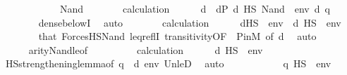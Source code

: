 \begin{isabellebody}
\ \ \ \ \isamarkupfalse%
\ \isanewline
\ \ \ \ \isamarkupfalse%
\ Nand\isanewline
\ \ \ \ \isamarkupfalse%
\ \isamarkupfalse%
\ calculation\isanewline
\ \ \ \ \isamarkupfalse%
\ d\ \ {\isachardoublequoteopen}d{\isasymin}P{\isachardoublequoteclose}\ {\isachardoublequoteopen}d\ {\isasymtturnstile}HS\ Nand{\isacharparenleft}{\kern0pt}{\isasymphi}{\isacharcomma}{\kern0pt}\ {\isasympsi}{\isacharparenright}{\kern0pt}\ env{\isachardoublequoteclose}\ {\isachardoublequoteopen}d{\isasympreceq}\ q{\isachardoublequoteclose}\isanewline
\ \ \ \ \ \ \isamarkupfalse%
\ dense{\isacharunderscore}{\kern0pt}belowI\ \isamarkupfalse%
\ auto\isanewline
\ \ \ \ \isamarkupfalse%
\ \isamarkupfalse%
\ calculation\isanewline
\ \ \ \ \isamarkupfalse%
\ {\isachardoublequoteopen}{\isasymnot}{\isacharparenleft}{\kern0pt}d{\isasymtturnstile}HS\ {\isasympsi}\ env{\isacharparenright}{\kern0pt}{\isachardoublequoteclose}\ \ {\isachardoublequoteopen}d\ {\isasymtturnstile}HS\ {\isasymphi}\ env{\isachardoublequoteclose}\isanewline
\ \ \ \ \ \ \isamarkupfalse%
\ that\ ForcesHS{\isacharunderscore}{\kern0pt}Nand\ leq{\isacharunderscore}{\kern0pt}reflI\ transitivity{\isacharbrackleft}{\kern0pt}OF\ {\isacharunderscore}{\kern0pt}\ P{\isacharunderscore}{\kern0pt}in{\isacharunderscore}{\kern0pt}M{\isacharcomma}{\kern0pt}\ of\ d{\isacharbrackright}{\kern0pt}\ \isamarkupfalse%
\ auto\isanewline
\ \ \ \ \isamarkupfalse%
\ \isanewline
\ \ \ \ \isamarkupfalse%
\ arity{\isacharunderscore}{\kern0pt}Nand{\isacharunderscore}{\kern0pt}le{\isacharbrackleft}{\kern0pt}of\ {\isasymphi}\ {\isasympsi}{\isacharbrackright}{\kern0pt}\isanewline
\ \ \ \ \isamarkupfalse%
\ \isamarkupfalse%
\ calculation\isanewline
\ \ \ \ \isamarkupfalse%
\ {\isachardoublequoteopen}d\ {\isasymtturnstile}HS\ {\isasymphi}\ env{\isachardoublequoteclose}\ \isanewline
\ \ \ \ \ \ \ \isamarkupfalse%
\ HS{\isacharunderscore}{\kern0pt}strengthening{\isacharunderscore}{\kern0pt}lemma{\isacharbrackleft}{\kern0pt}of\ q\ {\isasymphi}\ d\ env{\isacharbrackright}{\kern0pt}\ Un{\isacharunderscore}{\kern0pt}leD{}\ \isamarkupfalse%
\ auto\isanewline
\ \ \ \ \isamarkupfalse%
\isanewline
\ \ \ \ \isamarkupfalse%
\ {\isachardoublequoteopen}{\isasymnot}\ {\isacharparenleft}{\kern0pt}q\ {\isasymtturnstile}HS\ {\isasympsi}\ env{\isacharparenright}{\kern0pt}{\isachardoublequoteclose}\isanewline

\end{isabellebody}
